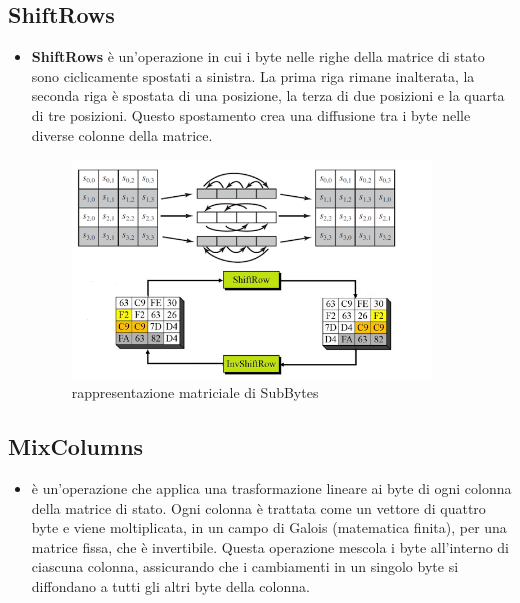 \documentclass[a4paper,12pt]{report}
\begin{document}
				\subsection*{ShiftRows}

				\begin{itemize}
				\item \textbf{ShiftRows} è un'operazione in cui i byte nelle
				righe della matrice di stato sono ciclicamente spostati a
				sinistra. La prima riga rimane inalterata, la seconda riga è
				spostata di una posizione, la terza di due posizioni e la quarta
				di tre posizioni. Questo spostamento crea una diffusione tra i
				byte nelle diverse colonne della matrice.
				\begin{figure}[H]
					\centering
					\includegraphics[width=0.9\textwidth]{shiftRow.png}
					\caption{rappresentazione matriciale di SubBytes}
				\end{figure}
				\end{itemize}

				\subsection*{MixColumns}

				\begin{itemize}
				\item è un'operazione che applica una
				trasformazione lineare ai byte di ogni colonna della matrice di
				stato. Ogni colonna è trattata come un vettore di quattro byte e
				viene moltiplicata, in un campo di Galois (matematica finita),
				per una matrice fissa, che è invertibile. Questa operazione
				mescola i byte all'interno di ciascuna colonna, assicurando che
				i cambiamenti in un singolo byte si diffondano a tutti gli altri
				byte della colonna.
				\end{itemize}
				\newpage
\end{document}

